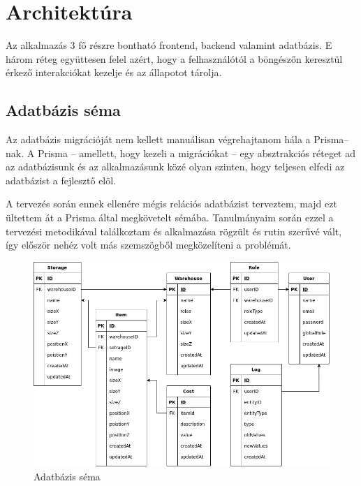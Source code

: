 \chapter{Architektúra}
Az alkalmazás 3 fő részre bontható frontend, backend valamint adatbázis.
E három réteg együttesen felel azért, hogy a felhasználótól a böngészőn keresztül érkező interakciókat kezelje és az állapotot tárolja.

\section{Adatbázis séma}
Az adatbázis migrációját nem kellett manuálisan végrehajtanom hála a Prisma–nak. 
A Prisma – amellett, hogy kezeli a migrációkat – egy absztrakciós réteget ad az adatbázisunk és az alkalmazásunk közé olyan szinten, hogy teljesen elfedi az adatbázist a fejlesztő elöl.

A tervezés során ennek ellenére mégis relációs adatbázist terveztem, majd ezt ültettem át a Prisma által megkövetelt sémába.
Tanulmányaim során ezzel a tervezési metodikával találkoztam és alkalmazása rögzült és rutin szerűvé vált, így először nehéz volt más szemszögből megközelíteni a problémát.

\begin{figure}[!ht]
  \centering
  \includegraphics[width=150mm, keepaspectratio]{figures/db.png}
  \caption{Adatbázis séma}
  \label{fig:db}
\end{figure}

